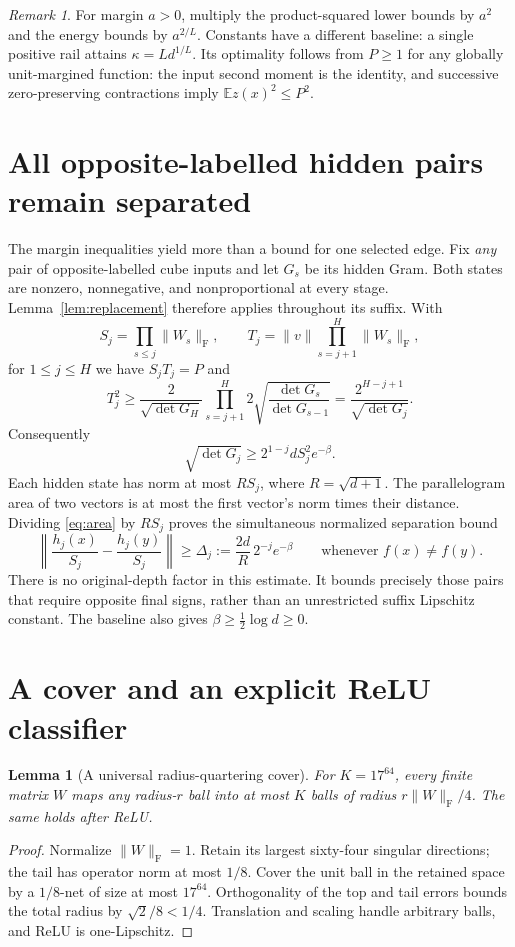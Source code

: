 \documentclass[11pt]{article}
\newtheorem{lemma}[theorem]{Lemma}
\theoremstyle{remark}\newtheorem{remark}[theorem]{Remark}
\newcommand{\F}{\mathrm F}
\begin{document}
\begin{remark}
For margin $a>0$, multiply the product-squared lower bounds by $a^2$ and
the energy bounds by $a^{2/L}$.  Constants have a different baseline:
a single positive rail attains $\kappa=Ld^{1/L}$.  Its optimality follows
from $P\ge1$ for any globally unit-margined function: the input second
moment is the identity, and successive zero-preserving contractions imply
$\mathbb E z(x)^2\le P^2$.
\end{remark}

\section{All opposite-labelled hidden pairs remain separated}
The margin inequalities yield more than a bound for one selected edge.
Fix \emph{any} pair of opposite-labelled cube inputs and let $G_s$ be its
hidden Gram.  Both states are nonzero, nonnegative, and nonproportional
at every stage.  Lemma~\ref{lem:replacement} therefore applies throughout
its suffix.  With
\[
 S_j=\prod_{s\le j}\|W_s\|_\F,\qquad
 T_j=\|v\|\prod_{s=j+1}^H\|W_s\|_\F,
\]
for $1\le j\le H$ we have $S_jT_j=P$ and
\[
 T_j^2\ge
 \frac{2}{\sqrt{\det G_H}}
 \prod_{s=j+1}^H2\sqrt{\frac{\det G_s}{\det G_{s-1}}}
 =\frac{2^{H-j+1}}{\sqrt{\det G_j}}.
\]
Consequently
\begin{equation}\label{eq:area}
 \sqrt{\det G_j}\ge2^{1-j}dS_j^2e^{-\beta}.
\end{equation}
Each hidden state has norm at most $RS_j$, where $R=\sqrt{d+1}$.
The parallelogram area of two vectors is at most the first vector's norm
times their distance.  Dividing \eqref{eq:area} by $RS_j$ proves the
simultaneous normalized separation bound
\begin{equation}\label{eq:separation}
 \left\|\frac{h_j(x)}{S_j}-\frac{h_j(y)}{S_j}\right\|
 \ge\Delta_j:=\frac{2d}{R}\,2^{-j}e^{-\beta}
 \qquad\text{whenever }f(x)\ne f(y).
\end{equation}
There is no original-depth factor in this estimate.  It bounds precisely
those pairs that require opposite final signs, rather than an unrestricted
suffix Lipschitz constant.  The baseline also gives
$\beta\ge\tfrac12\log d\ge0$.

\section{A cover and an explicit ReLU classifier}
\begin{lemma}[A universal radius-quartering cover]\label{lem:cover}
For $K=17^{64}$, every finite matrix $W$ maps any radius-$r$ ball into at
most $K$ balls of radius $r\|W\|_\F/4$.  The same holds after ReLU.
\end{lemma}
\begin{proof}
Normalize $\|W\|_\F=1$.  Retain its largest sixty-four singular directions;
the tail has operator norm at most $1/8$. Cover the unit ball in the
retained space by a $1/8$-net of size at most $17^{64}$. Orthogonality of
the top and tail errors bounds the total radius by $\sqrt2/8<1/4$.
Translation and scaling handle arbitrary balls, and ReLU is one-Lipschitz.
\end{proof}
\end{document}
